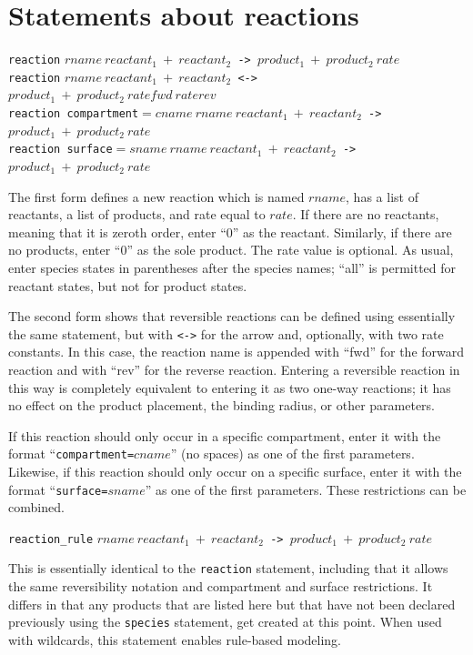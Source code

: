 \documentclass {book}
\newcommand {\ttt} {\texttt}
\begin{document}
\section{Statements about reactions}

\begin{description}

\item{\ttt{reaction} $rname\ reactant_1\ +\ reactant_2$\ttt{ -> }$product_1\ +\ product_2\ rate$\\
\ttt{reaction} $rname\ reactant_1\ +\ reactant_2$\ttt{ <-> }$product_1\ +\ product_2\ ratefwd\ raterev$\\
\ttt{reaction compartment}$=cname\ rname\ reactant_1\ +\ reactant_2$\ttt{ -> }$product_1\ +\ product_2\ rate$\\
\ttt{reaction surface}$=sname\ rname\ reactant_1\ +\ reactant_2$\ttt{ -> }$product_1\ +\ product_2\ rate$}

The first form defines a new reaction which is named $rname$, has a list of reactants, a list of products, and rate equal to $rate$. If there are no reactants, meaning that it is zeroth order, enter ``0'' as the reactant. Similarly, if there are no products, enter ``0'' as the sole product. The rate value is optional. As usual, enter species states in parentheses after the species names; ``all'' is permitted for reactant states, but not for product states.

The second form shows that reversible reactions can be defined using essentially the same statement, but with \ttt{<->} for the arrow and, optionally, with two rate constants. In this case, the reaction name is appended with ``fwd'' for the forward reaction and with ``rev'' for the reverse reaction. Entering a reversible reaction in this way is completely equivalent to entering it as two one-way reactions; it has no effect on the product placement, the binding radius, or other parameters.

If this reaction should only occur in a specific compartment, enter it with the format ``\ttt{compartment=}$cname$'' (no spaces) as one of the first parameters. Likewise, if this reaction should only occur on a specific surface, enter it with the format ``\ttt{surface=}$sname$'' as one of the first parameters. These restrictions can be combined.

\item{\ttt{reaction\_rule} $rname\ reactant_1\ +\ reactant_2$\ttt{ -> }$product_1\ +\ product_2\ rate$}

This is essentially identical to the \ttt{reaction} statement, including that it allows the same reversibility notation and compartment and surface restrictions. It differs in that any products that are listed here but that have not been declared previously using the \ttt{species} statement, get created at this point. When used with wildcards, this statement enables rule-based modeling.


\end{description}
\end{document}
